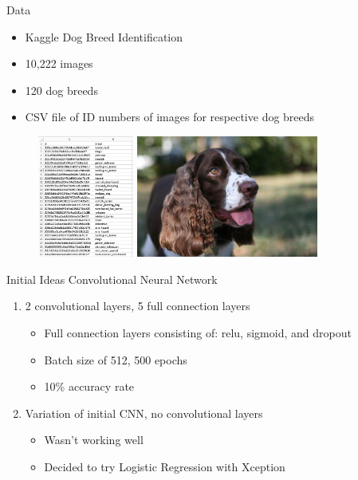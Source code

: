 \documentclass[leqno]{beamer}
\begin{document}
\begin{frame}{Data}
    \begin{itemize}
        \item Kaggle Dog Breed Identification
        \item 10,222 images
        \item 120 dog breeds
        \item CSV file of ID numbers of images for respective dog breeds
    \end{itemize}
    \begin{figure}
        \includegraphics[height=4cm]{labelPreview.jpg}
        \hspace{0.25in}
        \includegraphics[height=4cm]{dog5.jpg}
    \end{figure}
\end{frame}

\begin{frame}{Initial Ideas}
    Convolutional Neural Network
    \begin{enumerate}
        \item 2 convolutional layers, 5 full connection layers
        \begin{itemize}
            \item Full connection layers consisting of: relu, sigmoid, and dropout
            \item Batch size of 512, 500 epochs
            \item 10\% accuracy rate
        \end{itemize}
        \pause
        \item Variation of initial CNN, no convolutional layers
        \begin{itemize}
            \item Wasn't working well
            \item Decided to try Logistic Regression with Xception
        \end{itemize}
    \end{enumerate}
\end{frame}
\end{document}
